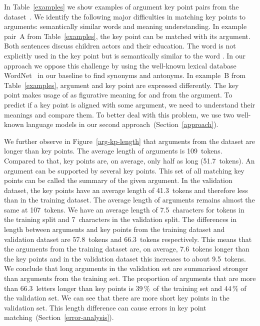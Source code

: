 In Table~\ref{examples} we show examples of argument key point pairs from the \ArgKP dataset~\cite{Bar-HaimEFKLS2020}. 
We identify the following major difficulties in matching key points to arguments: semantically similar words and meaning 
understanding.
In example pair~A from Table~\ref{examples}, the key point can be matched with its argument. Both sentences discuss 
children actors and their education. The word  is not explicitly used in the key point but is 
semantically similar to the word . 
In our approach we oppose this challenge by using the well-known lexical database WordNet~\cite{Miller1995} in our 
baseline to find synonyms and antonyms.
In example~B from Table~\ref{examples}, argument and key point are expressed differently. 
The key point makes usage of  as figurative meaning for  and  from the argument. 
To predict if a key point is aligned with some argument, we need to understand their meanings and compare them. 
To better deal with this problem, we use two well-known language models in our second approach~(Section~\ref{approach}). 

We further observe in Figure~\ref{arg-kp-length} that arguments from the \ArgKP dataset are longer than key points.
The average length of arguments is 109~tokens. Compared to that, key points are, on average, only half as long (51.7~tokens).
An argument can be supported by several key points. This set of all matching key points can be called the summary of the given argument.  
In the validation dataset, the key points have an average length of 41.3~tokens and therefore less than in the training dataset. 
The average length of arguments remains almost the same at 107~tokens. 
We have an average length of 7.5~characters for tokens in the training split and 7~characters in the validation split. %
The differences in length between arguments and key points from the training dataset and validation dataset are 57.8~tokens and 66.3~tokens respectively. 
This means that the arguments from the training dataset are, on average, 7.6~tokens longer than the key points and in the validation dataset this increases to about 9.5~tokens. %
We conclude that long arguments in the validation set are summarised stronger than arguments from the training set. 
The proportion of arguments that are more than 66.3~letters %
longer than key points is 39\,\%~of the training set 
and 44\,\% of the validation set. 
We can see that there are more short key points in the validation set. 
This length difference can cause errors in key point matching~(Section~\ref{error-analysis}).
